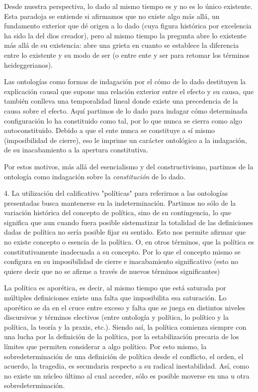 \documentclass{book}
\begin{document}
Desde nuestra perspectiva, lo dado al mismo tiempo es y no es lo único
existente. Esta paradoja se entiende si afirmamos que no existe algo más
allá, un fundamento exterior que dé origen a lo dado (cuya figura
histórica por excelencia ha sido la del dios creador), pero al mismo
tiempo la pregunta abre lo existente más allá de su existencia: abre una
grieta en cuanto se establece la diferencia entre lo existente y su modo
de ser (o entre ente y ser para retomar los términos heideggerianos).

Las ontologías como formas de indagación por el cómo de lo dado
destituyen la explicación causal que supone una relación exterior entre
el efecto y su causa, que también conlleva una temporalidad lineal donde
existe una precedencia de la causa sobre el efecto. Aquí partimos de lo
dado para indagar cómo determinada configuración lo ha constituido como
tal, por lo que nunca se cierra como algo autoconstituido. Debido a que
el ente nunca se constituye a sí mismo (imposibilidad de cierre), eso le
imprime un carácter ontológico a la indagación, de su inacabamiento a la
apertura constitutiva.

Por estos motivos, más allá del esencialismo y del constructivismo,
partimos de la ontología como indagación sobre la \emph{constitución} de
lo dado.

4. La utilización del calificativo "políticas" para referirnos a las
ontologías presentadas busca mantenerse en la indeterminación. Partimos
no sólo de la variación histórica del concepto de política, sino de su
contingencia, lo que significa que aun cuando fuera posible sistematizar
la totalidad de las definiciones dadas de política no sería posible
fijar su sentido. Esto nos permite afirmar que no existe concepto o
esencia de la política. O, en otros términos, que la política es
constitutivamente inadecuada a su concepto. Por lo que el concepto mismo
se configura en su imposibilidad de cierre e inacabamiento significativo
(esto no quiere decir que no se afirme a través de nuevos términos
significantes)

La política es aporética, es decir, al mismo tiempo que está saturada
por múltiples definiciones existe una falta que imposibilita esa
saturación. Lo aporético se da en el cruce entre exceso y falta que se
juega en distintos niveles discursivos y términos electivos (entre
ontología y política, lo político y la política, la teoría y la praxis,
etc.). Siendo así, la política comienza siempre con una lucha por la
definición de la política, por la estabilización precaria de los límites
que permiten considerar a algo político. Por esto mismo, la
sobredeterminación de una definición de política desde el conflicto, el
orden, el acuerdo, la tragedia, es secundaria respecto a su radical
inestabilidad. Así, como no existe un núcleo último al cual acceder,
sólo es posible moverse en una u otra sobredeterminación.
\end{document}
